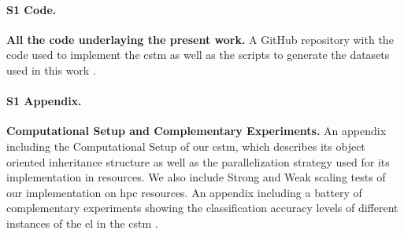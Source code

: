 \documentclass[10pt,letterpaper]{article}
\begin{document}
\paragraph*{S1 Code.}
\label{S1_Code}
{\bf All the code underlaying the present work.} A GitHub repository with the code used to implement the \gls{cstm} as well as the scripts to generate the datasets used in this work \cite{dematties_dario_2019_2580396}.

\paragraph*{S1 Appendix.}
\label{S1_Appendix}
{\bf Computational Setup and Complementary Experiments.} An appendix including the Computational Setup of our \gls{cstm}, which describes its object oriented inheritance structure as well as the parallelization strategy used for its implementation in  resources. We also include Strong and Weak scaling tests of our implementation on \gls{hpc} resources. An appendix including a battery of complementary experiments showing the classification accuracy levels of different instances of the \gls{el} in the \gls{cstm} \cite{dematties_dario_2019_2654939}.





\end{document}
